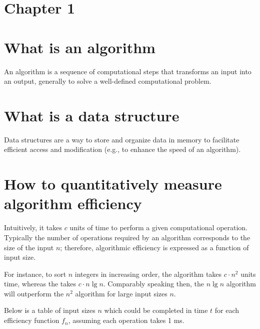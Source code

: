 
\section*{\Huge\bfseries Chapter 1}

\section{What is an algorithm}
An algorithm is a sequence of computational steps that transforms an input into an output, generally to solve a well-defined computational problem.

\section{What is a data structure}
Data structures are a way to store and organize data in memory to facilitate efficient access and modification (e.g., to enhance the speed of an algorithm).

\section{How to quantitatively measure algorithm efficiency}
Intuitively, it takes $c$ units of time to perform a given computational operation. Typically the number of operations required by an algorithm corresponds to the size of the input $n$; therefore, algorithmic efficiency is expressed as a function of input size. 

For instance, to sort $n$ integers in increasing order, the  algorithm takes $c \cdot n^2$ units time, whereas the  takes $c \cdot n \lg n$. Comparably speaking then, the $n \lg n$ algorithm will outperform the $n^2$ algorithm for large input sizes $n$. 

Below is a table of input sizes $n$ which could be completed in time $t$ for each efficiency function $f_n$, assuming each operation takes 1 ms.

